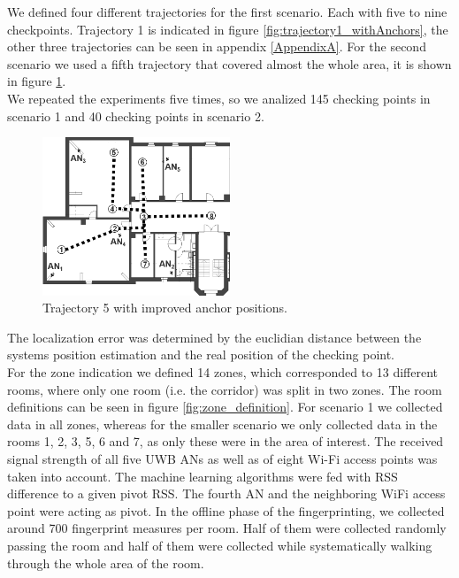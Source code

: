 \noindent\hspace*{5mm}%
We defined four different trajectories for the first scenario. Each with five to nine checkpoints. Trajectory 1 is indicated in figure \ref{fig:trajectory1_withAnchors}, the other three trajectories can be seen in appendix \ref{AppendixA}.
For the second scenario we used a fifth trajectory that covered almost the whole area, it is shown in figure \ref{fig:trajectory5_withAnchors}.\\
\noindent\hspace*{5mm}%
We repeated the experiments five times, so we analized 145 checking points in scenario 1 and 40 checking points in scenario 2.\begin{figure}[th]
\centering
\includegraphics[width=0.5\textwidth]{Figures/trajectory5_withAnchors}
\decoRule
\caption[Trajectory 5]{Trajectory 5 with improved anchor positions.}
\label{fig:trajectory5_withAnchors}
\end{figure}
The localization error was determined by the euclidian distance between the systems position estimation and the real position of the checking point.\\
\noindent\hspace*{5mm}%
For the zone indication we defined 14 zones, which corresponded to 13 different rooms, where only one room (i.e. the corridor) was split in two zones. The room definitions can be seen in figure \ref{fig:zone_definition}. For scenario 1 we collected data in all zones, whereas for the smaller scenario we only collected data in the rooms 1, 2, 3, 5, 6 and 7, as only these were in the area of interest. The received signal strength of all five UWB ANs as well as of eight Wi-Fi access points was taken into account. The machine learning algorithms were fed with RSS difference to a given pivot RSS. The fourth AN and the neighboring WiFi access point were acting as pivot. In the offline phase of the fingerprinting, we collected around 700 fingerprint measures per room. Half of them were collected randomly passing the room and half of them were collected while systematically walking through the whole area of the room.
